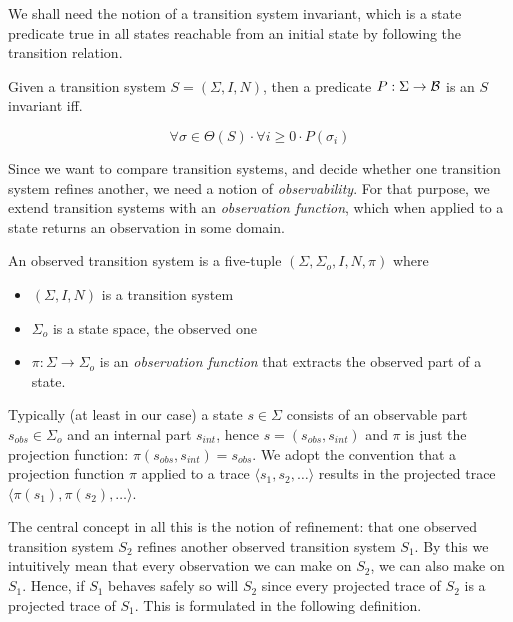 We shall need the notion of a  transition system invariant, which is
a state predicate true  in all states reachable  from an initial state
by following the transition relation.

\begin{definition}[Invariant]
\label{def-invariants}
Given a transition system $S = (\Sigma,I,N)$, then a predicate 
$P : \Sigma \rightarrow {\cal B}$ is an $S$ invariant iff.

\[
\forall \sigma \in \Theta(S) \cdot 
\forall i \ge 0 \cdot P(\sigma_i)
\]

\end{definition}

Since we want to compare transition systems, and decide whether one transition
system refines another, we need a notion of {\em observability}.
For that purpose, we extend transition systems with an {\em observation 
function}, which when applied to a state returns an observation in some domain.

\begin{definition}
\label{def-observed-transition-system}  
An        observed  transition      system      is  a     five-tuple
$(\Sigma,\Sigma_o,I,N,\pi)$ where

\begin{itemize}

  \item $(\Sigma,I,N)$ is a transition system

  \item $\Sigma_o$ is a state space, the observed one

  \item $\pi : \Sigma \rightarrow \Sigma_o$ is an {\em observation function}
        that extracts the observed part of a state.

\end{itemize}
\end{definition}

Typically (at least in our case) a state  $s \in \Sigma$ consists
of an   observable  part $s_{obs} \in \Sigma_o$  and  an  internal part
$s_{int}$, hence $s = (s_{obs},s_{int})$ and $\pi$ is just the
projection function: $\pi(s_{obs},s_{int}) = s_{obs}$.
We adopt the convention that a projection  function $\pi$ applied to a
trace $\langle s_1,  s_2, \ldots \rangle$ results in  the
projected trace $\langle \pi(s_1), \pi(s_2), \ldots \rangle$.

The central concept in all this is  the notion of refinement: that one
observed transition system  $S_2$ refines  another observed transition
system $S_1$.  By  this we intuitively mean  that every observation we
can make on  $S_2$,  we can  also make on   $S_1$.  Hence,  if  $S_1$
behaves safely so will $S_2$ since every projected  trace of $S_2$ is  a
projected trace  of $S_1$.  
This is formulated in the following definition.

